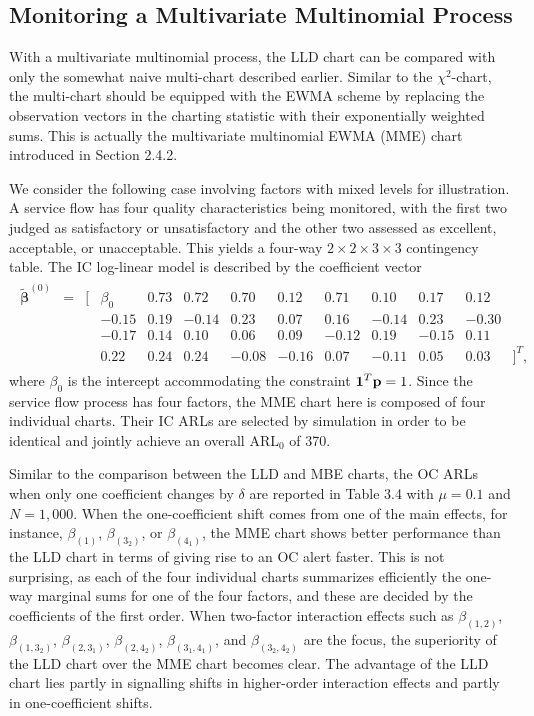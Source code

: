 \subsection{Monitoring a Multivariate Multinomial Process}

With a multivariate multinomial process, the LLD chart can be compared with only the
somewhat naive multi-chart described earlier. Similar to the $\chi^2$-chart, the
multi-chart should be equipped with the EWMA scheme by replacing the observation
vectors in the charting statistic with their exponentially weighted sums. This is
actually the multivariate multinomial EWMA (MME) chart introduced in Section 2.4.2.

We consider the following case involving factors with mixed levels for illustration.
A service flow has four quality characteristics being monitored, with the first two
judged as satisfactory or unsatisfactory and the other two assessed as excellent,
acceptable, or unacceptable. This yields a four-way $2\times2\times3\times3$
contingency table. The IC log-linear model is described by the coefficient vector
\begin{eqnarray}
\begin{array}{rrrrrrrrrrrrl}
\widetilde{\bm{\beta}}^{(0)} & = & [ & \beta_0 & 0.73 & 0.72 & 0.70 &
0.12 & 0.71 & 0.10 & 0.17 & 0.12 & \\
& & & -0.15 & 0.19 & -0.14 & 0.23 & 0.07 & 0.16 & -0.14 & 0.23 & -0.30 & \\
& & & -0.17 & 0.14 & 0.10 & 0.06 & 0.09 & -0.12 & 0.19 & -0.15 & 0.11 & \\
& & & 0.22 & 0.24 & 0.24 & -0.08 & -0.16 & 0.07 & -0.11 & 0.05 & 0.03 & ]^T,
\end{array}
\nonumber
\end{eqnarray}
where $\beta_0$ is the intercept accommodating the constraint $\boldsymbol1^T{\bf p}=1$.
Since the service flow process has four factors, the MME chart here is composed of
four individual charts. Their IC ARLs are selected by simulation in order to be
identical and jointly achieve an overall ARL$_0$ of 370.

Similar to the comparison between the LLD and MBE charts, the OC ARLs when only one
coefficient changes by $\delta$ are reported in Table 3.4 with $\mu=0.1$ and
$N=1,000$. When the one-coefficient shift comes from one of the main effects, for
instance, $\beta_{(1)}$, $\beta_{(3_2)}$, or $\beta_{(4_1)}$, the MME chart shows
better performance than the LLD chart in terms of giving rise to an OC alert faster.
This is not surprising, as each of the four individual charts summarizes efficiently
the one-way marginal sums for one of the four factors, and these are decided by the
coefficients of the first order. When two-factor interaction effects such as
$\beta_{(1,2)}$, $\beta_{(1,3_2)}$, $\beta_{(2,3_1)}$, $\beta_{(2,4_2)}$,
$\beta_{(3_1,4_1)}$, and $\beta_{(3_2,4_2)}$ are the focus, the superiority of the
LLD chart over the MME chart becomes clear. The advantage of the LLD chart lies
partly in signalling shifts in higher-order interaction effects and partly in
one-coefficient shifts.

